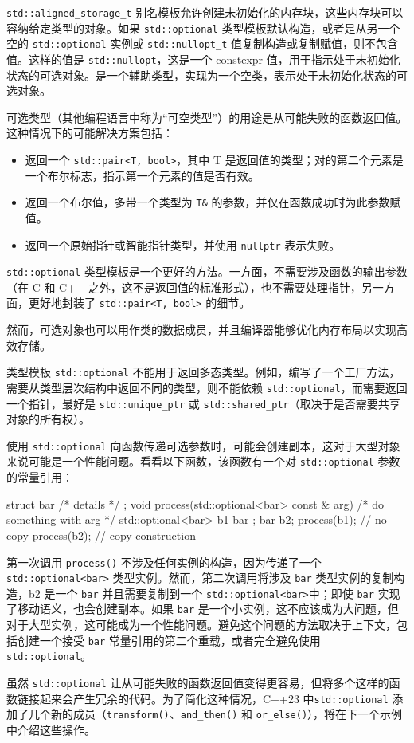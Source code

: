 \verb|std::aligned_storage_t| 别名模板允许创建未初始化的内存块，这些内存块可以容纳给定类型的对象。如果 \verb|std::optional| 类型模板默认构造，或者是从另一个空的 \verb|std::optional| 实例或 \verb|std::nullopt_t| 值复制构造或复制赋值，则不包含值。这样的值是 \verb|std::nullopt|，这是一个 constexpr 值，用于指示处于未初始化状态的可选对象。是一个辅助类型，实现为一个空类，表示处于未初始化状态的可选对象。

可选类型（其他编程语言中称为“可空类型”）的用途是从可能失败的函数返回值。这种情况下的可能解决方案包括：

\begin{itemize}
\item
返回一个 \verb|std::pair<T, bool>|，其中 T 是返回值的类型；对的第二个元素是一个布尔标志，指示第一个元素的值是否有效。

\item
返回一个布尔值，多带一个类型为 \verb|T&| 的参数，并仅在函数成功时为此参数赋值。

\item
返回一个原始指针或智能指针类型，并使用 \verb|nullptr| 表示失败。
\end{itemize}

\verb|std::optional| 类型模板是一个更好的方法。一方面，不需要涉及函数的输出参数（在 C 和 C++ 之外，这不是返回值的标准形式），也不需要处理指针，另一方面，更好地封装了 \verb|std::pair<T, bool>| 的细节。

然而，可选对象也可以用作类的数据成员，并且编译器能够优化内存布局以实现高效存储。

\begin{myNotic}
类型模板 \verb|std::optional| 不能用于返回多态类型。例如，编写了一个工厂方法，需要从类型层次结构中返回不同的类型，则不能依赖 \verb|std::optional|，而需要返回一个指针，最好是 \verb|std::unique_ptr| 或 \verb|std::shared_ptr|（取决于是否需要共享对象的所有权）。
\end{myNotic}

使用 \verb|std::optional| 向函数传递可选参数时，可能会创建副本，这对于大型对象来说可能是一个性能问题。看看以下函数，该函数有一个对 \verb|std::optional| 参数的常量引用：

\begin{cpp}
struct bar { /* details */ };
void process(std::optional<bar> const & arg)
{
    /* do something with arg */
}
std::optional<bar> b1{ bar{} };
bar b2{};
process(b1); // no copy
process(b2); // copy construction
\end{cpp}

第一次调用 \verb|process()| 不涉及任何实例的构造，因为传递了一个 \verb|std::optional<bar>| 类型实例。然而，第二次调用将涉及 \verb|bar| 类型实例的复制构造，b2 是一个 \verb|bar| 并且需要复制到一个 \verb|std::optional<bar>|中；即使 \verb|bar| 实现了移动语义，也会创建副本。如果 \verb|bar| 是一个小实例，这不应该成为大问题，但对于大型实例，这可能成为一个性能问题。避免这个问题的方法取决于上下文，包括创建一个接受 \verb|bar| 常量引用的第二个重载，或者完全避免使用 \verb|std::optional|。


虽然 \verb|std::optional| 让从可能失败的函数返回值变得更容易，但将多个这样的函数链接起来会产生冗余的代码。为了简化这种情况，C++23 中\verb|std::optional| 添加了几个新的成员（\verb|transform()|、\verb|and_then()| 和 \verb|or_else()|），将在下一个示例中介绍这些操作。

